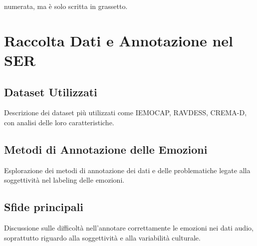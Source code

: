 numerata, ma \`e solo scritta in grassetto.
\section{Raccolta Dati e Annotazione nel SER}                 %
\subsection{Dataset Utilizzati}
Descrizione dei dataset più utilizzati come IEMOCAP, RAVDESS, CREMA-D, con analisi delle loro caratteristiche.
\subsection{Metodi di Annotazione delle Emozioni}
Esplorazione dei metodi di annotazione dei dati e delle problematiche legate alla soggettività nel labeling delle emozioni.
\subsection{Sfide principali}
Discussione sulle difficoltà nell'annotare correttamente le emozioni nei dati audio, soprattutto riguardo alla soggettività e alla variabilità culturale.
